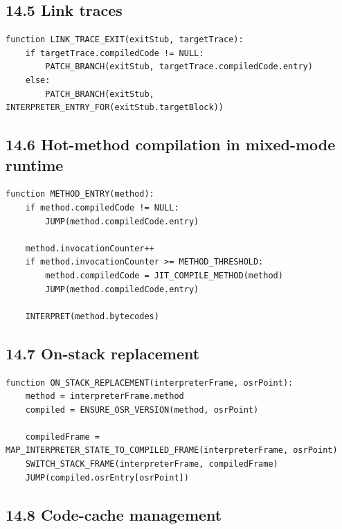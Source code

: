 \documentclass[10pt,letterpaper]{article}
\begin{document}
\subsection*{14.5 Link traces}

\begin{verbatim}
function LINK_TRACE_EXIT(exitStub, targetTrace):
    if targetTrace.compiledCode != NULL:
        PATCH_BRANCH(exitStub, targetTrace.compiledCode.entry)
    else:
        PATCH_BRANCH(exitStub, INTERPRETER_ENTRY_FOR(exitStub.targetBlock))
\end{verbatim}

\subsection*{14.6 Hot-method compilation in mixed-mode runtime}

\begin{verbatim}
function METHOD_ENTRY(method):
    if method.compiledCode != NULL:
        JUMP(method.compiledCode.entry)

    method.invocationCounter++
    if method.invocationCounter >= METHOD_THRESHOLD:
        method.compiledCode = JIT_COMPILE_METHOD(method)
        JUMP(method.compiledCode.entry)

    INTERPRET(method.bytecodes)
\end{verbatim}

\subsection*{14.7 On-stack replacement}

\begin{verbatim}
function ON_STACK_REPLACEMENT(interpreterFrame, osrPoint):
    method = interpreterFrame.method
    compiled = ENSURE_OSR_VERSION(method, osrPoint)

    compiledFrame = MAP_INTERPRETER_STATE_TO_COMPILED_FRAME(interpreterFrame, osrPoint)
    SWITCH_STACK_FRAME(interpreterFrame, compiledFrame)
    JUMP(compiled.osrEntry[osrPoint])
\end{verbatim}

\subsection*{14.8 Code-cache management}
\end{document}
